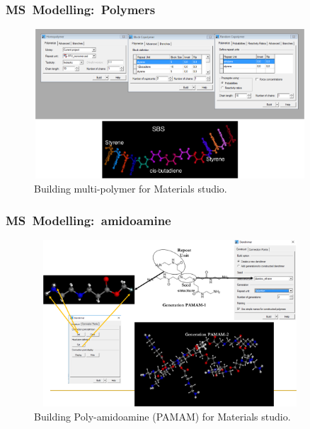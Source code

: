 \frame
{
	\frametitle{\textrm{MS~Modelling:~Polymers}}
\begin{figure}[h!]
\centering
\vspace*{-0.05in}
\includegraphics[height=2.20in,width=4.00in,viewport=0 0 1350 740,clip]{Figures/MS-Building_multypolymer.png}
\caption{\tiny \textrm{Building multi-polymer for Materials studio.}}%
\label{MS-Building_multypolymer}
\end{figure}
}

\frame
{
	\frametitle{\textrm{MS~Modelling:~amidoamine}}
\begin{figure}[h!]
\centering
\vspace*{-0.10in}
\includegraphics[height=2.45in,width=4.00in,viewport=0 0 1050 700,clip]{Figures/MS-Building_dendrimer.png}
\caption{\tiny \textrm{Building Poly-amidoamine (PAMAM) for Materials studio.}}%
\label{MS-Building_dendrimer}
\end{figure}
}


